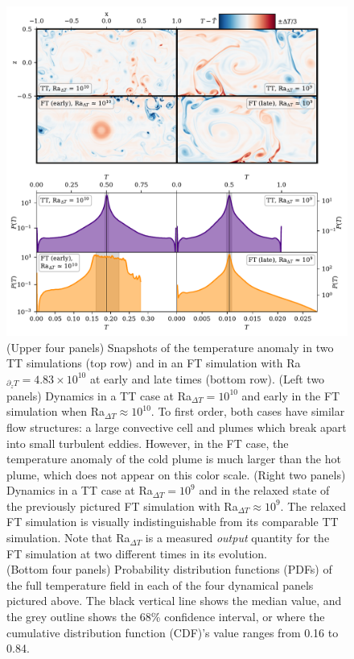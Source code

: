 \documentclass[aps, pre, onecolumn, nofootinbib, notitlepage, groupedaddress, amsfonts, amssymb, amsmath, longbibliography, superscriptaddress]{revtex4-1}
\begin{document}
\begin{figure}[p!]
\includegraphics[width=\textwidth]{./figs/rbc_evolution_dynamics.pdf}
\caption{ 
	(Upper four panels) Snapshots of the temperature anomaly in two TT simulations (top row) and in an FT simulation with Ra$_{\partial_z T} = 4.83 \times 10^{10}$ at early and late times (bottom row).
	(Left two panels) Dynamics in a TT case at Ra$_{\Delta T} = 10^{10}$ and early in the FT simulation when Ra$_{\Delta T} \approx 10^{10}$.
	To first order, both cases have similar flow structures: a large convective cell and plumes which break apart into small turbulent eddies.
	However, in the FT case, the temperature anomaly of the cold plume is much larger than the hot plume, which does not appear on this color scale.
	(Right two panels) Dynamics in a TT case at Ra$_{\Delta T} = 10^9$ and in the relaxed state of the previously pictured FT simulation with Ra$_{\Delta T} \approx 10^9$.
	The relaxed FT simulation is visually indistinguishable from its comparable TT simulation.
	Note that Ra$_{\Delta T}$ is a measured \emph{output} quantity for the FT simulation at two different times in its evolution.
\\	
	(Bottom four panels) Probability distribution functions (PDFs) of the full temperature field in each of the four dynamical panels pictured above.
	The black vertical line shows the median value, and the grey outline shows the 68\% confidence interval, or where the cumulative distribution function (CDF)'s value ranges from 0.16 to 0.84.
}
\end{figure}
\end{document}
